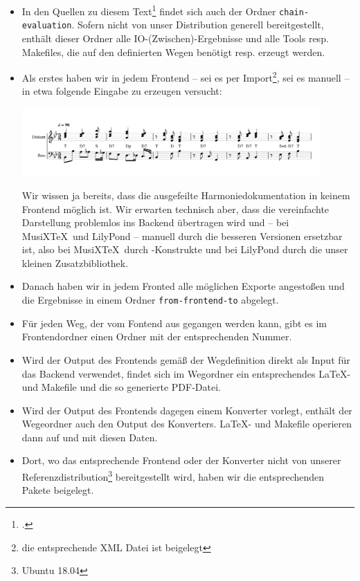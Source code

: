 \begin{itemize}
  \item In den Quellen zu diesem Text\footcite[vgl.][\nopage wp]{Reincke2019a}
  findet sich auch der Ordner \texttt{chain-evaluation}. Sofern nicht von unser
  Distribution generell bereitgestellt, enthält dieser Ordner alle
  IO-(Zwischen)-Ergebnisse und alle Tools resp. Makefiles, die auf den
  definierten Wegen benötigt resp. erzeugt werden.
  \item Als erstes haben wir in jedem Frontend -- sei es per Import\footnote{die
  entsprechende XML Datei ist beigelegt}, sei es manuell -- in etwa folgende
  Eingabe zu erzeugen versucht:
  \begin{center}
    \includegraphics[width=0.9\textwidth]{frontends/musescore/cadenca3-musescore-300dpi.png}
  \end{center}
  Wir wissen ja bereits, dass die ausgefeilte Harmoniedokumentation in keinem
  Frontend möglich ist. Wir erwarten technisch aber, dass die vereinfachte
  Darstellung problemlos ins Backend übertragen wird und -- bei MusiX\TeX\ und
  LilyPond -- manuell durch die besseren Versionen ersetzbar ist, also
  bei MusiX\TeX\ durch -Konstrukte und bei LilyPond durch die unser
  kleinen Zusatzbibliothek.
  \item Danach haben wir in jedem Fronted alle möglichen Exporte angestoßen und
  die Ergebnisse in einem Ordner \texttt{from-frontend-to} abgelegt.
  \item Für jeden Weg, der vom Fontend aus gegangen werden kann, gibt es im
  Frontendordner einen Ordner mit der entsprechenden Nummer.
  \item Wird der Output des Frontends gemäß der Wegdefinition direkt als Input für
  das Backend verwendet, findet sich im Wegordner ein entsprechendes \LaTeX- und
  Makefile und die so generierte PDF-Datei.
  \item Wird der Output des Frontends dagegen einem Konverter vorlegt, enthält
  der Wegeordner auch den Output des Konverters. \LaTeX- und Makefile
  operieren dann auf und mit diesen Daten.
  \item Dort, wo das entsprechende Frontend oder der Konverter nicht von unserer
  Referenzdistribution\footnote{Ubuntu 18.04} bereitgestellt wird, haben wir die
  entsprechenden Pakete beigelegt.
\end{itemize}

